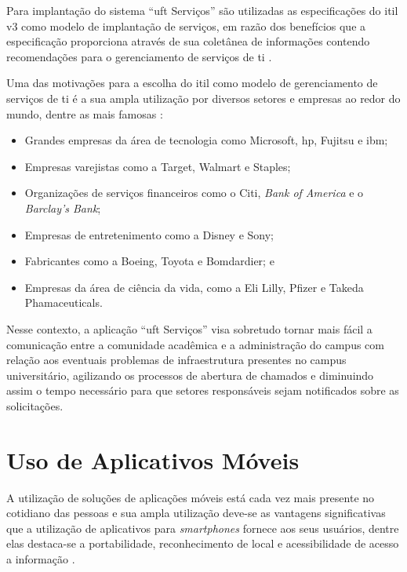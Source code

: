 Para implantação do sistema ``\acrshort{uft} Serviços'' são utilizadas as especificações do \gls{itil} v3 como modelo de implantação de serviços, em razão dos benefícios que a especificação proporciona através de sua coletânea de informações contendo recomendações para o gerenciamento de serviços de \acrshort{ti} \cite{introductoryoverviewofitil}.

Uma das motivações para a escolha do \gls{itil} como modelo de gerenciamento de serviços de \acrshort{ti} é a sua ampla utilização por diversos setores e empresas ao redor do mundo, dentre as mais famosas \cite{arraj2010itil}:

\begin{itemize}
    \item Grandes empresas da área de tecnologia como Microsoft, \gls{hp}, Fujitsu e \gls{ibm};
    \item Empresas varejistas como a Target, Walmart e Staples;
    \item Organizações de serviços financeiros como o Citi, \textit{Bank of America} e o \textit{Barclay's Bank};
    \item Empresas de entretenimento como a Disney e Sony;
    \item Fabricantes como a Boeing, Toyota e Bomdardier; e
    \item Empresas da área de ciência da vida, como a Eli Lilly, Pfizer e Takeda Phamaceuticals.
\end{itemize}

Nesse contexto, a aplicação ``\acrshort{uft} Serviços'' visa sobretudo tornar mais fácil a comunicação entre a comunidade acadêmica e a administração do campus com relação aos eventuais problemas de infraestrutura presentes no campus universitário, agilizando os processos de abertura de chamados e diminuindo assim o tempo necessário para que setores responsáveis sejam notificados sobre as solicitações.

\section*{Uso de Aplicativos Móveis}

\noindent A utilização de soluções de aplicações móveis está cada vez mais presente no cotidiano das pessoas e sua ampla utilização deve-se as vantagens significativas que a utilização de aplicativos para \textit{smartphones} fornece aos seus usuários, dentre elas destaca-se a portabilidade, reconhecimento de local e acessibilidade de acesso a informação \cite{nayebi2012state}.

